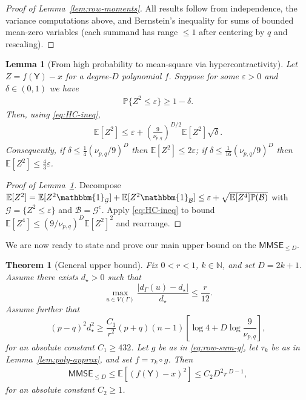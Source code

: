 \documentclass[12pt]{article}
\newcommand{\bE}{\mathbb{E}}
\newtheorem{theorem}{Theorem}
\newtheorem{lemma}{Lemma}
\newcommand{\Ind}{\mathbbm{1}}
\newcommand{\p}[1]{\left(#1\right)}
\newcommand{\pp}[1]{\left[#1\right]}
\newcommand{\s}[1]{\mathsf{#1}}
\begin{document}
\begin{proof}[Proof of Lemma~\ref{lem:row-moments}]
All results follow from independence, the variance computations above, and Bernstein's inequality for sums of bounded mean-zero variables (each summand has range $\leq 1$ after centering by $q$ and rescaling).
\end{proof}
\begin{lemma}[From high probability to mean-square via hypercontractivity]\label{lem:HP-to-MSE}
Let $Z=f(\s{Y})-x$ for a degree-$D$ polynomial $f$. Suppose for some $\varepsilon>0$ and $\delta\in(0,1)$ we have
\begin{align}
\mathbb{P}\{Z^2\le\varepsilon\}\ge1-\delta.
\end{align}
Then, using \eqref{eq:HC-ineq},
\begin{align}
\bE[Z^2]\le\varepsilon+\p{\frac{9}{\nu_{p,q}}}^{D/2}\bE[Z^2]\sqrt{\delta}.
\end{align}
Consequently, if $\delta\le\tfrac{1}{4}(\nu_{p,q}/9)^{D}$ then $\bE[Z^2]\le 2\varepsilon$; if $\delta\le\tfrac{1}{16}(\nu_{p,q}/9)^{D}$ then $\bE[Z^2]\le\tfrac{4}{3}\varepsilon$.
\end{lemma}

\begin{proof}[Proof of Lemma~\ref{lem:HP-to-MSE}]
Decompose $\bE[Z^2]=\bE[Z^2\Ind_{\mathcal{G}}]+\bE[Z^2\Ind_{\mathcal{B}}]\le \varepsilon+\sqrt{\bE[Z^4]\mathbb{P}(\mathcal{B})}$ with $\mathcal{G}=\{Z^2\le\varepsilon\}$ and $\mathcal{B}=\mathcal{G}^c$. Apply \eqref{eq:HC-ineq} to bound $\bE[Z^4]\le (9/\nu_{p,q})^D \bE[Z^2]^2$ and rearrange.
\end{proof}
We are now ready to state and prove our main upper bound on the $\s{MMSE}_{\leq D}$.
\begin{theorem}[General upper bound]\label{thm:upperLDP}
Fix $0<r<1$, $k\in\mathbb{N}$, and set $D=2k+1$. Assume there exists $d_\star>0$ such that
\begin{equation}\label{eq:near-regular}
\max_{u\in V(\Gamma)} \frac{|d_\Gamma(u)-d_\star|}{d_\star}\le\frac{r}{12}.
\end{equation}
Assume further that
\begin{equation}\label{eq:SNR}
(p-q)^2 d_\star^2\ge\frac{C_1}{r^2}(p+q)(n-1)\pp{\log 4+D\log\frac{9}{\nu_{p,q}}},
\end{equation}
for an absolute constant $C_1\ge 432$. Let $g$ be as in \eqref{eq:row-sum-g}, let $\tau_k$ be as in Lemma~\ref{lem:poly-approx}, and set $f=\tau_k\circ g$. Then
\begin{align}
\s{MMSE}_{\leq D}\leq\bE\pp{(f(\s{Y})-x)^2}\leq C_2D^2r^{\,D-1},
\end{align}
for an absolute constant $C_2\geq 1$.
\end{theorem}
\end{document}
